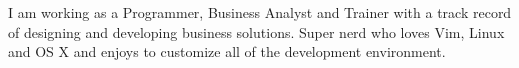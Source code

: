 

\begin{cvparagraph}

I am working as a Programmer, Business Analyst and Trainer with a track record of designing and developing business solutions. Super nerd who loves Vim, Linux and OS X and enjoys to customize all of the development environment.
\end{cvparagraph}
